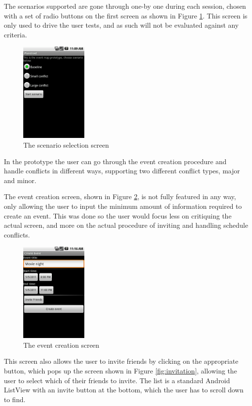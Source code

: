 \documentclass[a4paper,11pt]{report}
\begin{document}
The scenarios supported are gone through one-by one during each session, chosen
with a set of radio buttons on the first screen as shown in Figure
\ref{fig:scenario}. This screen is only used to drive the user tests, and as
such will not be evaluated against any criteria.

\begin{figure}[htb]
  \centering
  \includegraphics[height=50mm]{scenario}
  \caption{The scenario selection screen}
  \label{fig:scenario}
\end{figure}

In the prototype the user can go through the event creation procedure and handle
conflicts in different ways, supporting two different conflict types, major and
minor.

The event creation screen, shown in Figure \ref{fig:creation}, is not fully
featured in any way, only allowing the user to input the minimum amount of
information required to create an event. This was done so the user would focus
less on critiquing the actual screen, and more on the actual procedure of
inviting and handling schedule conflicts.

\begin{figure}[htb]
  \centering
  \includegraphics[height=50mm]{eventcreation}
  \caption{The event creation screen}
  \label{fig:creation}
\end{figure}

This screen also allows the user to invite friends by clicking on the
appropriate button, which pops up the screen shown in Figure
\ref{fig:invitation}, allowing the user to select which of their friends to
invite. The list is a standard Android ListView with an invite button at the
bottom, which the user has to scroll down to find.
\end{document}
